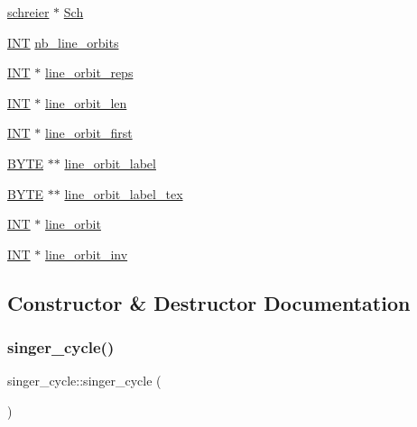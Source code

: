 \begin{DoxyCompactItemize}
\item 
\mbox{\hyperlink{classschreier}{schreier}} $\ast$ \mbox{\hyperlink{classsinger__cycle_af6d99668472f183eb6274efdad83d84e}{Sch}}
\item 
\mbox{\hyperlink{galois_8h_a09fddde158a3a20bd2dcadb609de11dc}{I\+NT}} \mbox{\hyperlink{classsinger__cycle_a5cabf8e5643903585edb861126eafa8e}{nb\+\_\+line\+\_\+orbits}}
\item 
\mbox{\hyperlink{galois_8h_a09fddde158a3a20bd2dcadb609de11dc}{I\+NT}} $\ast$ \mbox{\hyperlink{classsinger__cycle_a0676aeb1db96701a6b999fb130f4f9e7}{line\+\_\+orbit\+\_\+reps}}
\item 
\mbox{\hyperlink{galois_8h_a09fddde158a3a20bd2dcadb609de11dc}{I\+NT}} $\ast$ \mbox{\hyperlink{classsinger__cycle_ac1188376c85857862a1e7c6e2f024d0a}{line\+\_\+orbit\+\_\+len}}
\item 
\mbox{\hyperlink{galois_8h_a09fddde158a3a20bd2dcadb609de11dc}{I\+NT}} $\ast$ \mbox{\hyperlink{classsinger__cycle_a98a52fa7d1447fcf20cc8801de163425}{line\+\_\+orbit\+\_\+first}}
\item 
\mbox{\hyperlink{galois_8h_ab6cc7b4aeb6ea31aba2b3fbfc83ff5e6}{B\+Y\+TE}} $\ast$$\ast$ \mbox{\hyperlink{classsinger__cycle_a9379975b53159ede0c8bcce809c51ced}{line\+\_\+orbit\+\_\+label}}
\item 
\mbox{\hyperlink{galois_8h_ab6cc7b4aeb6ea31aba2b3fbfc83ff5e6}{B\+Y\+TE}} $\ast$$\ast$ \mbox{\hyperlink{classsinger__cycle_af846d1a45a8697257a09d4cb8306dbfc}{line\+\_\+orbit\+\_\+label\+\_\+tex}}
\item 
\mbox{\hyperlink{galois_8h_a09fddde158a3a20bd2dcadb609de11dc}{I\+NT}} $\ast$ \mbox{\hyperlink{classsinger__cycle_a5ddac941e1ab9b75065416843c6c4e37}{line\+\_\+orbit}}
\item 
\mbox{\hyperlink{galois_8h_a09fddde158a3a20bd2dcadb609de11dc}{I\+NT}} $\ast$ \mbox{\hyperlink{classsinger__cycle_aa7dff5afb1aec0a0981f24576953341b}{line\+\_\+orbit\+\_\+inv}}
\end{DoxyCompactItemize}


\subsection{Constructor \& Destructor Documentation}
\mbox{\label{classsinger__cycle_af1bad5ac4c9d96a726c59c131d69689e}} 
\subsubsection{\texorpdfstring{singer\+\_\+cycle()}{singer\_cycle()}}
{\footnotesize\ttfamily singer\+\_\+cycle\+::singer\+\_\+cycle (\begin{DoxyParamCaption}{ }\end{DoxyParamCaption})}


